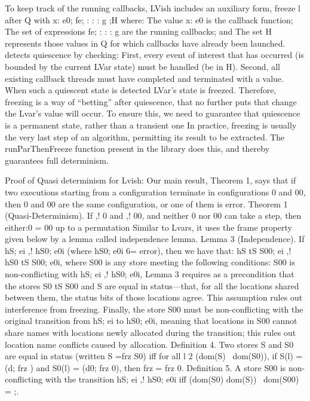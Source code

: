 \documentclass[twocolumn]{article}
\begin{document}
To keep track of the running callbacks, LVish includes an auxiliary form,
freeze l after Q with x: e0; fe; : : : g ;H
where:
 The value x: e0 is the callback function;
 The set of expressions fe; : : : g are the running callbacks; and
 The set H represents those values in Q for which callbacks have already been launched.
detects quiescence by checking: First, every event of interest that has occurred (is bounded by the current LVar state) must be handled (be in H). Second, all existing callback threads must have completed and terminated with a value. When such a quiescent state is detected LVar’s state is freezed.  Therefore, freezing is a way of “betting” after quiescence, that no further puts that change the Lvar’s value will occur. To ensure this, we need to guarantee that quiescence is a permanent state, rather than a transient one In practice, freezing is usually the very last step of an algorithm, permitting its result to be extracted. The runParThenFreeze function present in the library does this, and thereby guarantees full determinism.

Proof of Quasi determinism for Lvish: Our main result, Theorem 1, says that if two executions starting from a configuration  terminate in configurations 0 and 00, then 0 and 00 are the same configuration, or one of them is error.
Theorem 1 (Quasi-Determinism). If  ,! 0 and  ,! 00, and neither 0 nor 00 can take a step, then either:0 = 00 up to a permutation Similar to Lvars, it uses the frame property given below by a lemma called independence lemma. 
Lemma 3 (Independence). If hS; ei ,! hS0; e0i (where hS0; e0i 6= error), then we have that: hS tS S00; ei ,! hS0 tS S00; e0i,
where S00 is any store meeting the following conditions:
 S00 is non-conflicting with hS; ei ,! hS0; e0i,
Lemma 3 requires as a precondition that the stores S0 tS S00 and S are equal in status—that, for all the locations shared between them, the status bits of those locations agree. This assumption rules out interference from freezing. Finally, the store S00 must be non-conflicting with the original transition from hS; ei to hS0; e0i, meaning that locations in S00 cannot share names with locations newly allocated during the transition; this rules out location name conflicts caused by allocation. 
Definition 4. Two stores S and S0 are equal in status (written
S =frz S0) iff for all l 2 (dom(S) \ dom(S0)),
if S(l) = (d; frz ) and S0(l) = (d0; frz 0), then frz = frz 0.
Definition 5. A store S00 is non-conflicting with the transition
hS; ei ,! hS0; e0i iff (dom(S0)  dom(S)) \ dom(S00) = ;.
\end{document}
